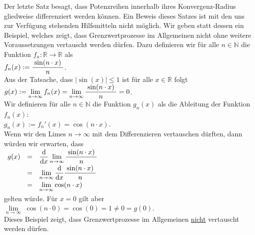\remark
Der letzte Satz besagt, dass Potenzreihen innerhalb ihres Konvergenz-Radius gliedweise
differenziert werden k\"onnen.   Ein Beweis dieses Satzes ist mit den uns zur Verf\"ugung
stehenden Hilfsmitteln nicht m\"oglich.  Wir geben statt dessen ein Beispiel, welches zeigt, dass
Grenzwertprozesse im Allgemeinen nicht ohne weitere Voraussetzungen vertauscht werden d\"urfen.
Dazu definieren wir f\"ur alle $n \in \mathbb{N}$ die Funktion $f_n:\mathbb{R} \rightarrow \mathbb{R}$ als
\\[0.2cm]
\hspace*{1.3cm}
$\displaystyle f_n(x) := \frac{\;\sin(n \cdot x)\;}{n}$.
\\[0.2cm]
Aus der Tatsache, dass $|\sin(x)| \leq 1$ ist f\"ur alle $x\in \mathbb{R}$ folgt
\\[0.2cm]
\hspace*{1.3cm}
$g(x) := \displaystyle\lim\limits_{n\rightarrow\infty} f_n(x) = \lim\limits_{n\rightarrow\infty} \frac{\;\sin(n \cdot x)\;}{n} = 0$. 
\\[0.2cm]
Wir definieren f\"ur alle $n\in\mathbb{N}$ die Funktion $g_n(x)$ als die Ableitung der Funktion $f_n(x)$:
\\[0.2cm]
\hspace*{1.3cm}
$g_n(x) := f_n'(x) = \cos(n \cdot x)$.
\\[0.2cm]
Wenn wir den Limes $n \rightarrow \infty$ mit dem Differenzieren vertauschen d\"urften, dann
w\"urden wir erwarten, dass 
\\[0.2cm]
\hspace*{1.3cm}
$
\begin{array}[t]{lcl}
g(x) & = & \displaystyle \displaystyle\frac{\textrm{d}}{\textrm{d}x} \lim\limits_{n\rightarrow\infty} \frac{\;\sin(n \cdot x)\;}{n} \\[0.2cm]
     & = & \lim\limits_{n\rightarrow\infty} \displaystyle\frac{\textrm{d}}{\textrm{d}x} \frac{\;\sin(n \cdot x)\;}{n} \\[0.2cm]
     & = & \displaystyle \lim\limits_{n\rightarrow\infty} \cos(n \cdot x) \\[0.2cm]
\end{array}
$
\\[0.2cm]
gelten w\"urde.  
F\"ur $x = 0$ gilt aber
\\[0.2cm]
\hspace*{1.3cm}
$\lim\limits_{n\rightarrow\infty} \;\cos(n \cdot 0) = \cos(0) = 1 \not= 0 = g(0)$.
\\[0.2cm]
Dieses Beispiel zeigt, dass Grenzwertprozesse im Allgemeinen \underline{nicht} vertauscht werden
d\"urfen. 
\eox

